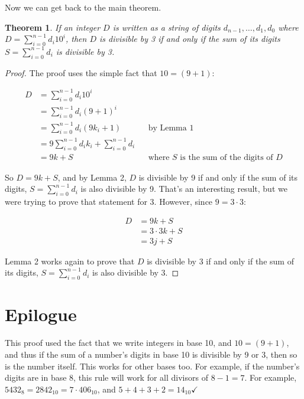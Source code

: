 \documentclass{article}
\newtheorem{theorem}{Theorem}
\begin{document}
Now we can get back to the main theorem.

\pagebreak

\begin{theorem} 
If an integer $D$ is written as a string of digits
$d_{n-1},\ldots,d_1,d_0$ where $D = \sum_{i=0}^{n-1} d_i 10^i$, then
$D$ is divisible by 3 if and only if the sum of its digits $S =
\sum_{i=0}^{n-1} d_i$ is divisible by 3.
\end{theorem}


\begin{proof}

The proof uses the simple fact that $10 = (9 + 1)$:
  
\begin{align*}    
D & = \sum_{i=0}^{n-1} d_i 10^i \\
  & = \sum_{i=0}^{n-1} d_i (9+1)^i \\
  & = \sum_{i=0}^{n-1} d_i (9k_i+1) && \text{by Lemma 1} \\
  & = 9\sum_{i=0}^{n-1} d_i k_i + \sum_{i=0}^{n-1} d_i \\
  & = 9k + S && \text{where $S$ is the sum of the digits of $D$}
\end{align*}

So $D = 9k + S$, and by Lemma 2, $D$ is divisible by 9 if and only if
the sum of its digits, $S = \sum_{i=0}^{n-1} d_i$ is also divisible by
9.  That's an interesting result, but we were trying to prove that
statement for 3.  However, since $9 = 3 \cdot 3$:

\begin{align*}    
D & = 9k + S \\
  & = 3 \cdot 3 k + S \\
  & = 3 j + S
\end{align*}

Lemma 2 works again to prove that $D$ is divisible by 3 if and only if
the sum of its digits, $S = \sum_{i=0}^{n-1} d_i$ is also divisible by
3.

\end{proof}

\section{Epilogue}

This proof used the fact that we write integers in base 10, and $10 =
(9+1)$, and thus if the sum of a number's digits in base 10 is
divisible by 9 or 3, then so is the number itself.  This works for
other bases too.  For example, if the number's digits are in base 8,
this rule will work for all divisors of $8 - 1 = 7$.  For example,
$5432_8 = 2842_{10} = 7 \cdot 406_{10}$, and $5+4+3+2 =
14_{10}\checkmark$
\end{document}
